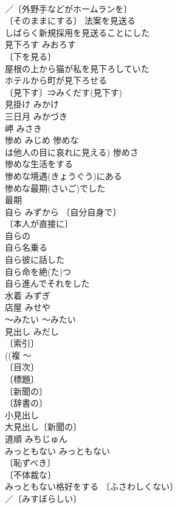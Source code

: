 \documentclass[8pt]{extreport}
\begin{document}
\begin{CJK}{UTF8}{min}
\\	／〔外野手などがホームランを〕
\\	〔そのままにする〕 法案を見送る 
\\	しばらく新規採用を見送ることにした 
\\	見下ろす	みおろす	
\\	〔下を見る〕
\\	屋根の上から猫が私を見下ろしていた 
\\	ホテルから町が見下ろせる 
\\	〔見下す〕⇒みくだす(見下す)
\\	見掛け	みかけ	
\\	三日月	みかづき	
\\	岬	みさき	
\\	惨め	みじめ	惨めな 
\\	は他人の目に哀れに見える) 惨めさ 
\\	惨めな生活をする 
\\	惨めな境遇(きょうぐう)にある 
\\	惨めな最期(さいご)でした 
\\	最期　
\\	自ら	みずから	〔自分自身で〕
\\	〔本人が直接に〕
\\	自らの 
\\	自ら名乗る 
\\	自ら彼に話した 
\\	自ら命を絶(た)つ 
\\	自ら進んでそれをした 
\\	水着	みずぎ	
\\	店屋	みせや	
\\	～みたい	～みたい	
\\	見出し	みだし	
\\	〔索引〕
\\	((複 〜
\\	〔目次〕
\\	〔標題〕
\\	〔新聞の〕
\\	〔辞書の〕
\\	小見出し 
\\	大見出し〔新聞の〕 
\\	道順	みちじゅん	
\\	みっともない	みっともない	
\\	〔恥ずべき〕
\\	〔不体裁な〕
\\	みっともない格好をする 〔ふさわしくない〕
\\	／〔みすぼらしい〕

\end{CJK}
\end{document}
